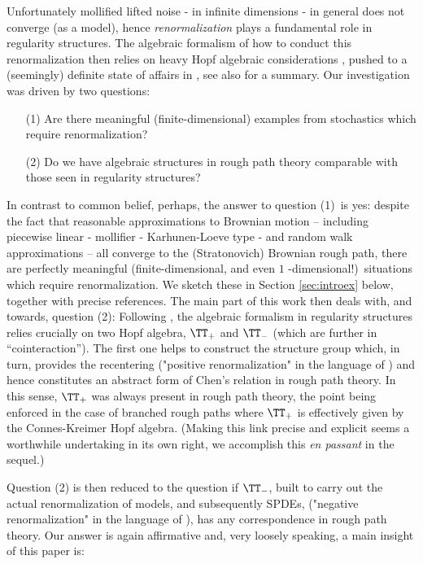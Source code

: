 \documentclass{article}
\begin{document}
\noindent Unfortunately mollified lifted noise - in infinite dimensions - in general does not converge (as a model), hence {\it renormalization} plays a fundamental role in regularity structures.  The algebraic formalism of how to conduct this renormalization then relies on heavy Hopf algebraic considerations \cite{Hairer14}, pushed to a (seemingly) definite state of affairs in \cite{BHZ16}, see also \cite{Hairer16} for a
summary. Our investigation was driven by two questions:%

{\it

\begin{itemize}
\item[(1)] Are there meaningful (finite-dimensional) examples from stochastics
which require renormalization?
\item[(2)] Do we have algebraic structures in rough path theory comparable
with those seen in regularity structures? 
\end{itemize}

}

In contrast to common belief, perhaps, the answer to question (1)\ is yes: despite
the fact that reasonable approximations to Brownian motion -- including
piecewise linear - mollifier - Karhunen-Loeve type - and random walk
approximations -- all converge to the (Stratonovich) Brownian rough path,
there are perfectly meaningful (finite-dimensional, and even $1$%
-dimensional!)\ situations which require renormalization. We sketch these in
Section \ref{sec:introex} below, together with precise references. The main part of this
work then deals with, and towards, question (2): Following \cite{BHZ16}, the algebraic formalism in
regularity structures relies crucially on two Hopf algebra, $\TT_{+}$ and $%
\TT_{-}$ (which are further in ``cointeraction''). The first one helps to
construct the structure group which, in turn, provides the recentering
("positive renormalization" in the language of \cite{BHZ16}) and hence constitutes
an abstract form of Chen's relation in rough path theory. In this sense, $%
\TT_{+}$ was always present in rough path theory, the point being enforced in
the case of branched rough paths \cite{Gubinelli10, HairerKelly15} where $%
\TT_{+}$ is effectively given by the Connes-Kreimer Hopf algebra. (Making this
link precise and explicit seems a worthwhile undertaking in its own right,
we accomplish this {\it en passant} in the sequel.) 

Question (2) is then reduced to the question if $\TT_{-}$, built to carry
out the actual renormalization of models, and subsequently SPDEs, ("negative
renormalization" in the language of \cite{BHZ16}), has any correspondence in rough
path theory. Our answer is again affirmative and, very loosely speaking, 
a main insight of this paper is:
\end{document}
